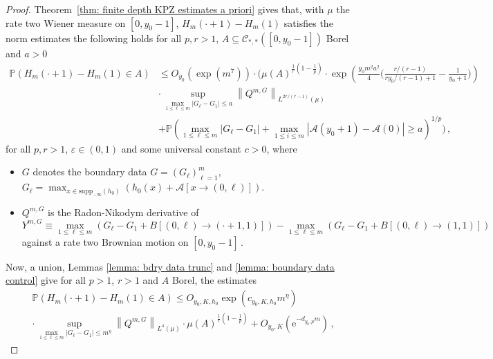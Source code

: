 \documentclass[11pt, reqno]{amsart}
\numberwithin{equation}{section}
\newcommand{\PP}{\ensuremath{\mathbb{P}}}
\newcommand{\norm}[1]{\left\lVert#1\right\rVert}
\begin{document}
\begin{proof}
    Theorem~\ref{thm: finite depth KPZ estimates a priori} gives that, with $\mu$ the rate two Wiener measure on $[0,y_0-1]$, $H_m(\cdot+1)-H_m(1)$ satisfies the norm estimates
the following holds for all $p, r> 1$, $A\subseteq \mathscr{C}_{*, *}([0,y_0-1])$ Borel and $a> 0$
\begin{equation*}
    \begin{array}{ll}
        \PP ( H_m(\cdot + 1)-H_m(1)\in A ) &\le O_{y_0}(\exp(m^7))\cdot\bigg( \mu(A)^{\frac{1}{r}(1-\frac{1}{p})}\cdot\exp\left({\frac{y_0m^2 a^2}{4}\big(\frac{r/(r-1)}{ry_0/(r-1)+1}-\frac{1}{y_0+1}\big)}\right)\\
        &\cdot \displaystyle\sup_{\max_{1\le \ell \le m}|G_\ell - G_1| \le a}\norm{Q^{m, G}}_{L^{2r/(r-1)}(\mu)}  \\
        & + \mathbb{P}\left(\displaystyle \max_{1\le \ell \le m}|G_\ell - G_1| + \max_{1\le i \le m}|\mathcal{A}(y_0+1)-\mathcal{A}(0)|\ge a\right)^{1/p}\bigg) \,,
    \end{array}
\end{equation*}
for all $p,r>1$, $\varepsilon \in(0,1)$ and some universal constant $c>0$, where 
\begin{itemize} 
\item[1.] $G$ denotes the boundary data $G = (G_{\ell})_{\ell=1}^m$,
$G_\ell = \displaystyle\max_{x\in \mathrm{supp}_{-\infty}(h_0)}(h_0(x)+\mathcal{A}[x\to (0,\ell)])$.
\item[2.] $Q^{m, G}$ is the Radon-Nikodym  derivative of 
\begin{equation*}
Y^{m, G}\equiv \displaystyle\max_{1\le \ell \le m}(G_{\ell} -G_1 + B[(0,\ell)\to (\cdot+1,1)])-\displaystyle\max_{1\le \ell \le m}(G_{\ell} -G_1 + B[(0,\ell)\to (1,1)])
\end{equation*}
against a rate two Brownian motion on $[0, y_0-1]$\,.  
\end{itemize}
Now, a union, Lemmas \ref{lemma: bdry data trunc} and \ref{lemma: boundary data control} give for all $p>1$, $r>1$ and $A$ Borel, the estimates
\begin{equation*}
    \begin{array}{ll}
        &\PP \left( H_m(\cdot + 1)-H_m(1)\in A \right) \le O_{y_0, K, h_0}\exp\left(c_{y_0, K, h_0} m^\eta\right)\\
        & \cdot  \displaystyle\sup_{\displaystyle\max_{1\le \ell \le m}|G_\ell - G_1| \le m^\eta}\norm{Q^{m, G}}_{L^{4}(\mu)} \cdot \mu(A)^{\frac{1}{r}(1-\frac{1}{p})}+ O_{y_0, K}(\mathrm{e}^{-d_{y_0, p} m})\,,

\end{array}
\end{equation*}
\end{proof}
\end{document}
